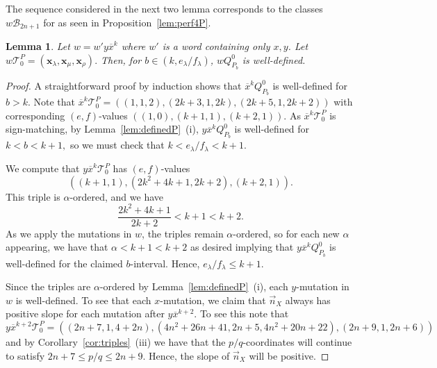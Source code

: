 \documentclass[11pt, reqno]{amsart}
\newtheorem{lemma}[thm]{Lemma}
\theoremstyle{remark}
\numberwithin{equation}{subsection}
\numberwithin{figure}{section}
\theoremstyle{customremark}
\newcommand{\Tt}{\mathcal{T}}
\newcommand{\vn}{{\vec{n}}}
\newcommand{\ov}{\overline}
\newcommand{\al}{{\alpha}}
\newcommand{\la}{{\lambda}}
\begin{document}
 The sequence considered in the next two lemma corresponds to the classes $w\mathcal{B}_{2n+1}$ for as seen in Proposition~\ref{lem:perf4P}. 
\begin{lemma} \label{lem:bDefP1}
Let $w=w'y\ov{x}^k$ where $w'$ is a word containing only $x,y$. Let $w\Tt_0^P=(\bm{x}_\la,\bm{x}_\mu,\bm{x}_\rho).$ Then, for $b \in (k,e_\la/f_\la)$, $wQ_{P_b}^0$ is well-defined. 
\end{lemma}
\begin{proof}
    A straightforward proof by induction shows that $\ov{x}^kQ_{P_b}^0$ is well-defined for $b>k.$ Note that $\ov{x}^k\Tt_0^P=\left((1,1,2),(2k+3,1,2k),(2k+5,1,2k+2)\right)$
    with corresponding $(e,f)$-values $((1,0),(k+1,1),(k+2,1)).$ As $\ov{x}^k\Tt_0^P$ is sign-matching, by Lemma~\ref{lem:definedP}~(i),  $y\ov{x}^kQ_{P_b}^0$ is well-defined for $k<b<k+1,$ so we must check that $k<e_\la/f_\la<k+1.$

  
    We compute that $y\ov{x}^k\Tt_0^P$ has $(e,f)$-values 
    \[ \left((k+1,1),(2k^2+4k+1,2k+2),(k+2,1)\right).\]
    This triple is $\al$-ordered, and we have
    \[ \frac{2k^2+4k+1}{2k+2}<k+1<k+2.\]
    As we apply the mutations in $w$, the triples remain $\al$-ordered, so for each new $\al$ appearing, we have that  $\al< k+1<k+2$ as desired implying that $y\ov{x}^kQ_{P_b}^0$ is well-defined for the claimed $b$-interval. Hence, $e_\la/f_\la \leq k+1.$

    Since the triples are $\al$-ordered by Lemma~\ref{lem:definedP}~(i), each $y$-mutation in $w$ is well-defined. To see that each $x$-mutation, we claim that $\vn_X$ always has positive slope for each mutation after $y\ov{x}^{k+2}.$ To see this note that \[y\ov{x}^{k+2}\Tt_0^P=((2n+7,1,4+2n),(4n^2+26n+41,2n+5,4n^2+20n+22),(2n+9,1,2n+6))\]
    and by Corollary~\ref{cor:triples}~(iii) we have that the $p/q$-coordinates will continue to satisfy $2n+7 \leq p/q \leq 2n+9.$ Hence, the slope of $\vn_X$ will be positive. 
\end{proof}
\end{document}
